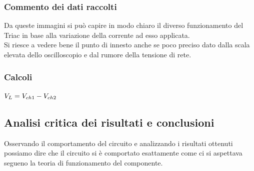 \documentclass[12pt]{article}
\begin{document}
        \subsubsection{Commento dei dati raccolti}
        Da queste immagini si può capire in modo chiaro il diverso funzionamento del Triac in base alla variazione della corrente ad esso applicata.\\ Si riesce a vedere bene il punto di innesto anche se poco preciso dato dalla scala elevata dello oscilloscopio e dal rumore della tensione di rete.\\

        \subsubsection{Calcoli}
        $V_L=V_{ch1}-V_{ch2}\\$
    \subsection{Analisi critica dei risultati e conclusioni}
    Osservando il comportamento del circuito e analizzando i risultati ottenuti possiamo dire che il circuito si è comportato esattamente come ci si aspettava segueno la teoria di funzionamento del componente.\\
\end{document}
